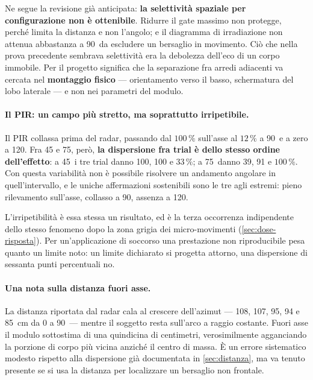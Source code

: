 Ne segue la revisione già anticipata: \textbf{la selettività spaziale per configurazione
non è ottenibile}. Ridurre il gate massimo non protegge, perché limita la distanza e non
l'angolo; e il diagramma di irradiazione non attenua abbastanza a 90\textdegree\ da
escludere un bersaglio in movimento. Ciò che nella prova precedente sembrava
selettività era la debolezza dell'eco di un corpo immobile. Per il progetto significa
che la separazione fra arredi adiacenti va cercata nel \textbf{montaggio fisico} ---
orientamento verso il basso, schermatura del lobo laterale --- e non nei parametri del
modulo.

\paragraph{Il PIR: un campo più stretto, ma soprattutto irripetibile.} Il PIR collassa
prima del radar, passando dal $100\,\%$ sull'asse al $12\,\%$ a 90\textdegree\ e a zero
a 120\textdegree. Fra 45 e 75\textdegree, però, \textbf{la dispersione fra trial è dello
stesso ordine dell'effetto}: a 45\textdegree\ i tre trial danno 100, 100 e
$33\,\%$; a 75\textdegree\ danno 39, 91 e $100\,\%$. Con questa variabilità non è
possibile risolvere un andamento angolare in quell'intervallo, e le uniche affermazioni
sostenibili sono le tre agli estremi: pieno rilevamento sull'asse, collasso a
90\textdegree, assenza a 120\textdegree.

L'irripetibilità è essa stessa un risultato, ed è la terza occorrenza indipendente dello
stesso fenomeno dopo la zona grigia dei micro-movimenti
(\cref{sec:dose-risposta}). Per un'applicazione di soccorso una prestazione non
riproducibile pesa quanto un limite noto: un limite dichiarato si progetta attorno, una
dispersione di sessanta punti percentuali no.

\paragraph{Una nota sulla distanza fuori asse.} La distanza riportata dal radar cala al
crescere dell'azimut --- 108, 107, 95, 94 e 85~cm da 0 a 90\textdegree\ --- mentre il
soggetto resta sull'arco a raggio costante. Fuori asse il modulo sottostima di una
quindicina di centimetri, verosimilmente agganciando la porzione di corpo più vicina
anziché il centro di massa. È un errore sistematico modesto rispetto alla dispersione
già documentata in \cref{sec:distanza}, ma va tenuto presente se si usa la distanza per
localizzare un bersaglio non frontale.

